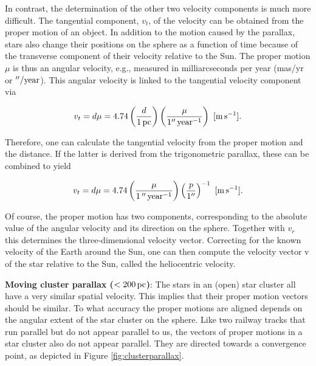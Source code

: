 \documentclass[a4paper,11pt]{article}
\begin{document}
{\noindent}In contrast, the determination of the other two velocity components is much more difficult. The tangential component, $v_t$, of the velocity can be obtained from the proper motion of an object. In addition to the motion caused by the parallax, stars also change their positions on the sphere as a function of time because of the transverse component of their velocity relative to the Sun. The proper motion $\mu$ is thus an angular velocity, e.g., measured in milliarcseconds per year (mas/yr or $''/{\rm year}$). This angular velocity is linked to the tangential velocity component via

\begin{align*}
    v_t = d\mu = 4.74\left(\frac{d}{1\,{\rm pc}}\right) \left(\frac{\mu}{1''\,{\rm year^{-1}}}\right) ~ [{\rm m\,s^{-1}}].
\end{align*}

{\noindent}Therefore, one can calculate the tangential velocity from the proper motion and the distance. If the latter is derived from the trigonometric parallax, these can be combined to yield

\begin{align*}
    v_t = d\mu = 4.74 \left(\frac{\mu}{1\,''\,{\rm year^{-1}}}\right) \left(\frac{p}{1''}\right)^{-1} ~ [{\rm m\,s^{-1}}].
\end{align*}

{\noindent}Of course, the proper motion has two components, corresponding to the absolute value of the angular velocity and its direction on the sphere. Together with $v_r$ this determines the three-dimensional velocity vector. Correcting for the known velocity of the Earth around the Sun, one can then compute the velocity vector v of the star relative to the Sun, called the heliocentric velocity.

{\noindent}\textbf{Moving cluster parallax ($<200\,{\rm pc}$)}: The stars in an (open) star cluster all have a very similar spatial velocity. This implies that their proper motion vectors should be similar. To what accuracy the proper motions are aligned depends on the angular extent of the star cluster on the sphere. Like two railway tracks that run parallel but do not appear parallel to us, the vectors of proper motions in a star cluster also do not appear parallel. They are directed towards a convergence point, as depicted in Figure \ref{fig:clusterparallax}.
\end{document}
